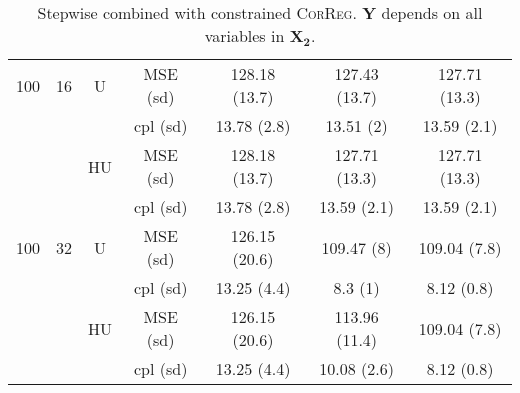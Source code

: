 \documentclass[11pt,a4paper]{article}
\begin{document}
\begin{table}[h!]
\begin{tabular}{|c|c|c|c|c|c|c|}
\hline
\hline %
100 & 16 & U&  MSE (sd) & 128.18 (13.7) & 127.43 (13.7) & 127.71 (13.3) \\
& & &  cpl (sd) & 13.78 (2.8) & 13.51 (2) & 13.59 (2.1) \\
 &  &HU & MSE (sd) & 128.18 (13.7) & 127.71 (13.3) & 127.71 (13.3) \\
& & & cpl (sd) & 13.78 (2.8) & 13.59 (2.1) & 13.59 (2.1) \\
\hline %
100 & 32 & U& MSE (sd) & 126.15 (20.6) & 109.47 (8) & 109.04 (7.8) \\
& & & cpl (sd) & 13.25 (4.4) & 8.3 (1) & 8.12 (0.8) \\
 &  &HU &  MSE (sd) & 126.15 (20.6) & 113.96 (11.4) & 109.04 (7.8) \\
& & & cpl (sd) & 13.25 (4.4) & 10.08 (2.6) & 8.12 (0.8) \\
\hline
\end{tabular} 
\caption{Stepwise  combined with constrained \textsc{CorReg}. $\boldsymbol{Y}$ depends on all variables in $\boldsymbol{X_2}$.}\label{YX2linstep}
\end{table}

\clearpage
\end{document}
